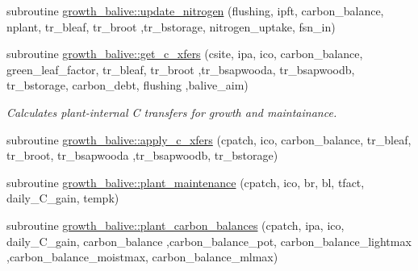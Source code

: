 \begin{DoxyCompactItemize}
subroutine \hyperlink{namespacegrowth__balive_a555ad92da5ad088f7161ea46d6ec8152}{growth\+\_\+balive\+::update\+\_\+nitrogen} (flushing, ipft, carbon\+\_\+balance, nplant, tr\+\_\+bleaf, tr\+\_\+broot                                                                                                                                               ,tr\+\_\+bstorage, nitrogen\+\_\+uptake, fsn\+\_\+in)
\item 
subroutine \hyperlink{namespacegrowth__balive_a2308a9254122e6c26aaf642a88815ca3}{growth\+\_\+balive\+::get\+\_\+c\+\_\+xfers} (csite, ipa, ico, carbon\+\_\+balance, green\+\_\+leaf\+\_\+factor, tr\+\_\+bleaf, tr\+\_\+broot                                                                                               ,tr\+\_\+bsapwooda, tr\+\_\+bsapwoodb, tr\+\_\+bstorage, carbon\+\_\+debt, flushing                                                                                                                       ,balive\+\_\+aim)
\begin{DoxyCompactList}\small\item\em Calculates plant-\/internal C transfers for growth and maintainance. \end{DoxyCompactList}\item 
subroutine \hyperlink{namespacegrowth__balive_a35d46b7fc86c4cecfe31abbc36713da2}{growth\+\_\+balive\+::apply\+\_\+c\+\_\+xfers} (cpatch, ico, carbon\+\_\+balance, tr\+\_\+bleaf, tr\+\_\+broot, tr\+\_\+bsapwooda                                                                                                                               ,tr\+\_\+bsapwoodb, tr\+\_\+bstorage)
\item 
subroutine \hyperlink{namespacegrowth__balive_af977e6b599dfde9155a3ab3cb7175f16}{growth\+\_\+balive\+::plant\+\_\+maintenance} (cpatch, ico, br, bl, tfact, daily\+\_\+\+C\+\_\+gain, tempk)
\item 
subroutine \hyperlink{namespacegrowth__balive_a9b1459d871399785ed2a6ec35e083b17}{growth\+\_\+balive\+::plant\+\_\+carbon\+\_\+balances} (cpatch, ipa, ico, daily\+\_\+\+C\+\_\+gain, carbon\+\_\+balance                                                                                                                                                                                       ,carbon\+\_\+balance\+\_\+pot, carbon\+\_\+balance\+\_\+lightmax                                                                                                                                                                                       ,carbon\+\_\+balance\+\_\+moistmax, carbon\+\_\+balance\+\_\+mlmax)

\end{DoxyCompactItemize}
